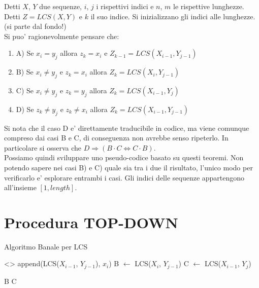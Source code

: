 Detti $X$, $Y$ due sequenze, $i$, $j$ i rispettivi indici e $n$, $m$ le rispettive lunghezze.
Detti $Z = LCS(X, Y)$ e $k$ il suo indice. Si inizializzano gli indici alle lunghezze. (si parte dal fondo!) \\

Si puo' ragionevolmente pensare che:

\begin{enumerate}

\item A) Se $x_{i} = y_{j}$ allora $z_{k} = x_{i}$ e $Z_{k-1} = LCS(X_{i-1}, Y_{j-1})$

\item B) Se $x_{i} \ne y_{j}$ e $z_{k} = x_{i}$ allora $Z_{k}= LCS(X_{i}, Y_{j-1})$

\item C) Se $x_{i} \ne y_{j}$ e $z_{k} = y_{j}$ allora $Z_{k}= LCS(X_{i-1}, Y_{j})$

\item D) Se $z_{k} \ne y_{j}$ e $z_{k} \ne x_{i}$ allora $Z_{k} = LCS(X_{i-1}, Y_{j-1})$

\end{enumerate}

Si nota che il caso D e' direttamente traducibile in codice, ma viene comunque compreso dai casi B e C, di conseguenza non avrebbe senso ripeterlo.
In particolare si osserva che $D \Rightarrow (B \cdot C \Leftrightarrow C \cdot B)$. \\

Possiamo quindi sviluppare uno pseudo-codice basato su questi teoremi.
Non potendo sapere nei casi B) e C) quale sia tra i due il risultato, l'unico modo per verificarlo e' esplorare entrambi i casi.
Gli indici delle sequenze appartengono all'insieme $[1, length]$.

\section{Procedura TOP-DOWN}

\begin{algorithm}
    \renewcommand\thealgorithm{}
    \caption{Algoritmo Banale per LCS}
    \begin{algorithmic}
                \State \Return <>
            \Else
                    \State \Return append(LCS($X_{i-1}$, $Y_{j-1}$), $x_{i}$)
                \Else
                    \State B $\gets$ LCS($X_{i}$, $Y_{j-1}$)
                    \State C $\gets$ LCS($X_{i-1}$, $Y_{j}$)

                        \State \Return B
                    \Else
                        \State \Return C
                    \EndIf
                \EndIf
            \EndIf
        \EndProcedure
    \end{algorithmic}
\end{algorithm}

